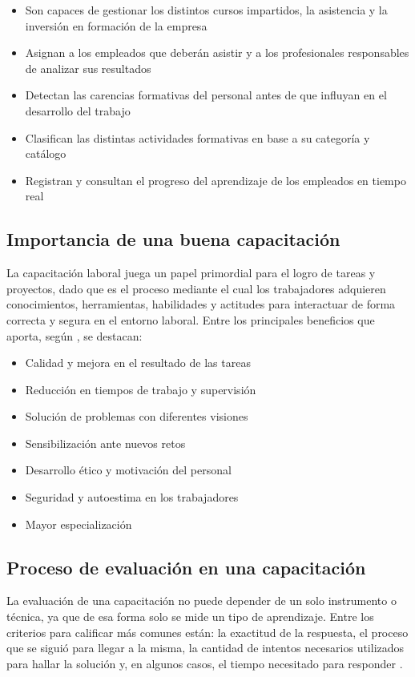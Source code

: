 \begin{itemize}
\item Son capaces de gestionar los distintos cursos impartidos, la asistencia y la inversión en formación de la empresa
\item Asignan a los empleados que deberán asistir y a los profesionales responsables de analizar sus resultados
\item Detectan las carencias formativas del personal antes de que influyan en el desarrollo del trabajo
\item Clasifican las distintas actividades formativas en base a su categoría y catálogo
\item Registran y consultan el progreso del aprendizaje de los empleados en tiempo real
\end{itemize}

\subsection{Importancia de una buena capacitación}
La capacitación laboral juega un papel primordial para el logro de tareas y proyectos, dado que es el proceso mediante el cual los trabajadores adquieren conocimientos, herramientas, habilidades y actitudes para interactuar de forma correcta y segura en el entorno laboral. Entre los principales beneficios que aporta, según \cite{RogelioE.Martinez2002}, se destacan:

\begin{itemize}
\item Calidad y mejora en el resultado de las tareas
\item Reducción en tiempos de trabajo y supervisión
\item Solución de problemas con diferentes visiones
\item Sensibilización ante nuevos retos
\item Desarrollo ético y motivación del personal
\item Seguridad y autoestima en los trabajadores
\item Mayor especialización
\end{itemize}

\subsection{Proceso de evaluación en una capacitación}
La evaluación de una capacitación no puede depender de un solo instrumento o técnica, ya que de esa forma solo se mide un tipo de aprendizaje. Entre los criterios para calificar más comunes están: la exactitud de la respuesta, el proceso que se siguió para llegar a la misma, la cantidad de intentos necesarios utilizados para hallar la solución y, en algunos casos, el tiempo necesitado para responder \cite{Jacobs2012}.

